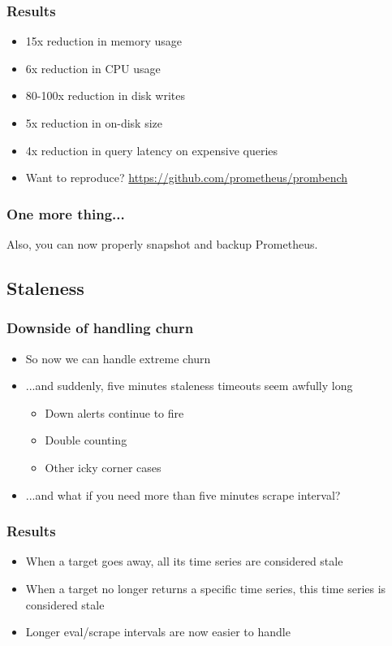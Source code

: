 \documentclass[t]{beamer}
\begin{document}
\begin{frame}
	\frametitle{Results}
	\begin{itemize}
		\item 15x reduction in memory usage
		\item 6x reduction in CPU usage
		\item 80-100x reduction in disk writes
		\item 5x reduction in on-disk size
		\item 4x reduction in query latency on expensive queries
		\item Want to reproduce? \url{https://github.com/prometheus/prombench}
	\end{itemize}
\end{frame}

\begin{frame}
	\frametitle{One more thing...}
	\vfill
	Also, you can now properly snapshot and backup Prometheus.
	\vfill
\end{frame}


\subsection{Staleness}


\begin{frame}
	\frametitle{Downside of handling churn}
	\begin{itemize}
		\item So now we can handle extreme churn
		\item ...and suddenly, five minutes staleness timeouts seem awfully long
		\begin{itemize}
			\item Down alerts continue to fire
			\item Double counting
			\item Other icky corner cases
		\end{itemize}
		\item ...and what if you need more than five minutes scrape interval?
	\end{itemize}
\end{frame}

\begin{frame}
	\frametitle{Results}
	\begin{itemize}
		\item When a target goes away, all its time series are considered stale
		\item When a target no longer returns a specific time series, this time series is considered stale
		\item Longer eval/scrape intervals are now easier to handle
	\end{itemize}
\end{frame}
\end{document}
